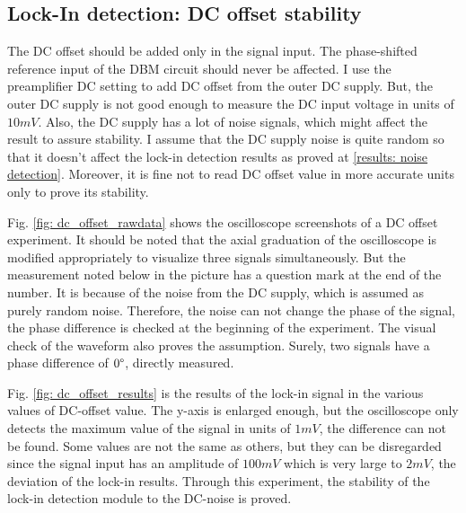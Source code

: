 \documentclass{article}
\begin{document}
\subsection{Lock-In detection: DC offset stability}
\label{results: dc_offset}
 The DC offset should be added only in the signal input.
 The phase-shifted reference input of the DBM circuit should never be affected.
 I use the preamplifier DC setting to add DC offset from the outer DC supply.
 But, the outer DC supply is not good enough to measure the DC input voltage in units of $10mV$.
 Also, the DC supply has a lot of noise signals, which might affect the result to assure stability.
 I assume that the DC supply noise is quite random so that it doesn't affect the lock-in detection results as proved at \ref{results: noise detection}.
 Moreover, it is fine not to read DC offset value in more accurate units only to prove its stability.

 Fig. \ref{fig: dc_offset_rawdata} shows the oscilloscope screenshots of a DC offset experiment.
 It should be noted that the axial graduation of the oscilloscope is modified appropriately to visualize three signals simultaneously.
 But the measurement noted below in the picture has a question mark at the end of the number.
 It is because of the noise from the DC supply, which is assumed as purely random noise.
 Therefore, the noise can not change the phase of the signal, the phase difference is checked at the beginning of the experiment.
 The visual check of the waveform also proves the assumption.
 Surely, two signals have a phase difference of $0\degree$, directly measured.

 Fig. \ref{fig: dc_offset_results} is the results of the lock-in signal in the various values of DC-offset value.
 The y-axis is enlarged enough, but the oscilloscope only detects the maximum value of the signal in units of $1mV$, the difference can not be found.
 Some values are not the same as others, but they can be disregarded since the signal input has an amplitude of $100mV$ which is very large to $2mV$, the deviation of the lock-in results.
 Through this experiment, the stability of the lock-in detection module to the DC-noise is proved.
\end{document}
